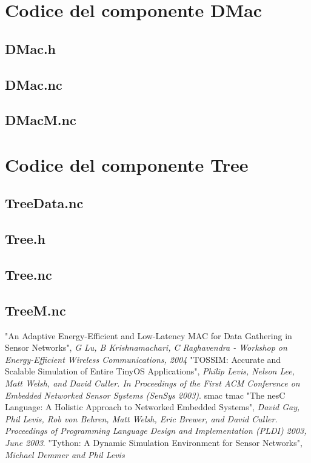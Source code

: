 \documentclass[twoside,11pt,a4paper,italian,openany]{book}
\begin{document}
\chapter{Codice del componente DMac}
\section{DMac.h}

\section{DMac.nc}

\section{DMacM.nc}


\chapter{Codice del componente Tree}
\section{TreeData.nc}

\section{Tree.h}

\section{Tree.nc}

\section{TreeM.nc}



\backmatter
\begin{thebibliography}{99}
 "An Adaptive Energy-Efficient and Low-Latency MAC for Data Gathering in Sensor Networks", \emph{G Lu, B Krishnamachari, C Raghavendra - Workshop on Energy-Efficient Wireless Communications, 2004} 
 "TOSSIM: Accurate and Scalable Simulation of Entire TinyOS Applications", \emph{Philip Levis, Nelson Lee, Matt Welsh, and David Culler. In Proceedings of the First ACM Conference on Embedded Networked Sensor Systems (SenSys 2003)}.  
 smac
 tmac
 "The nesC Language: A Holistic Approach to Networked Embedded Systems", \emph{David Gay, Phil Levis, Rob von Behren, Matt Welsh, Eric Brewer, and David Culler. Proceedings of Programming Language Design and Implementation (PLDI) 2003, June 2003}.
 "Tython: A Dynamic Simulation Environment for Sensor Networks", \emph{Michael Demmer and Phil Levis}
\end{thebibliography}
\end{document}
